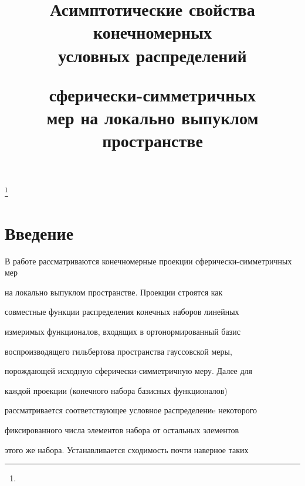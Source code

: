 

\title{Асимптотические свойства конечномерных\\ условных распределений 


сферически-симметричных\\ мер на локально выпуклом пространстве}


\thanks{}





\date{}




\pagestyle{plain} %







\maketitle


\label{begin}








\section*{Введение}





В работе рассматриваются конечномерные проекции сферически-симметричных мер


на локально выпуклом пространстве. Проекции строятся как


совместные функции распределения конечных наборов линейных


измеримых функционалов, входящих в ортонормированный базис


воспроизводящего гильбертова пространства гауссовской меры,


порождающей исходную сферически-симметричную меру. Далее для


каждой проекции (конечного набора базисных функционалов)


рассматривается соответствующее условное распределениe некоторого


фиксированного числа элементов набора от остальных элементов


этого же набора. Устанавливается сходимость почти наверное таких


